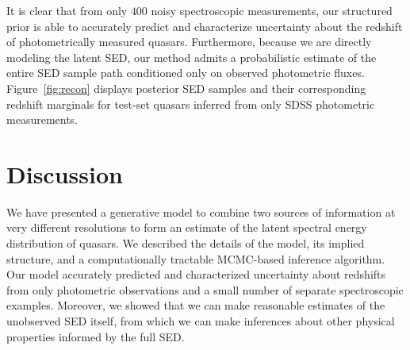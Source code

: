 \documentclass{article}
\newcommand{\red}[1]{\textcolor{red}{[TODO: #1]}}
\begin{document}
It is clear that from only $400$ noisy spectroscopic measurements, our structured prior is able to accurately predict and characterize uncertainty about the redshift of photometrically measured quasars.  
Furthermore, because we are directly modeling the latent SED, our method admits a probabilistic estimate of the entire SED sample path conditioned only on observed photometric fluxes.
Figure~\ref{fig:recon} displays posterior SED samples and their corresponding redshift marginals for test-set quasars inferred from only SDSS photometric measurements.  


\section{Discussion}
We have presented a generative model to combine two sources of information at very different resolutions to form an estimate of the latent spectral energy distribution of quasars.
We described the details of the model, its implied structure, and a computationally tractable MCMC-based inference algorithm. 
Our model accurately predicted and characterized uncertainty about redshifts from only photometric observations and a small number of separate spectroscopic examples. 
Moreover, we showed that we can make reasonable estimates of the unobserved SED itself, from which we can make inferences about other physical properties informed by the full SED.  
 
\end{document}
